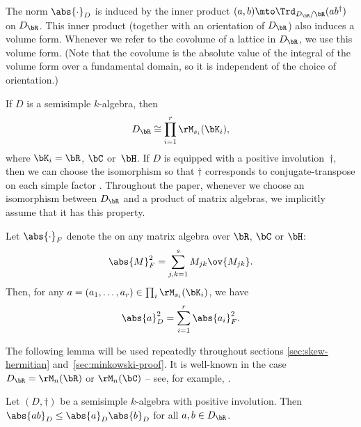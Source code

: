 The norm $\abs{\cdot}_D$ is induced by the inner product $(a,b) \mto \Trd_{D_\bR/\bR}(ab^\dag)$ on $D_\bR$.
This inner product (together with an orientation of $D_\bR$) also induces a volume form. Whenever we refer to the covolume of a lattice in $D_\bR$, we use this volume form.
(Note that the covolume is the absolute value of the integral of the volume form over a fundamental domain, so it is independent of the choice of orientation.)

If $D$ is a semisimple $k$-algebra, then
\[
D_\bR \cong \prod_{i=1}^r \rM_{s_i}(\bK_i),
\]
where $\bK_i = \bR$, $\bC$ or~$\bH$.
If $D$ is equipped with a positive involution~$\dag$, then we can choose the isomorphism so that $\dag$ corresponds to conjugate-transpose on each simple factor \cite[Prop.\,8.4.7]{Voi21}.
Throughout the paper, whenever we choose an isomorphism between $D_\bR$ and a product of matrix algebras, we implicitly assume that it has this property.

Let $\abs{\cdot}_F$ denote the  on any matrix algebra over $\bR$, $\bC$ or $\bH$:
\[
\abs{M}_F^2 = \sum_{j,k=1}^s M_{jk} \ov{M_{jk}}.
\]
Then, for any $a = (a_1, \dotsc, a_r) \in \prod_i \rM_{s_i}(\bK_i)$, we have
\[
\abs{a}_D^2 = \sum_{i=1}^r \abs{a_i}_F^2.
\]

The following lemma will be used repeatedly throughout sections \ref{sec:skew-hermitian} and~\ref{sec:minkowski-proof}. It is well-known in the case $D_\bR = \rM_n(\bR)$ or $\rM_n(\bC)$ -- see, for example, \cite[p.\,291]{HJ85}.

\begin{lemma} \label{length-submult}
Let $(D, \dag)$ be a semisimple $k$-algebra with positive involution.
Then $\abs{ab}_D \leq \abs{a}_D \abs{b}_D$ for all $a, b \in D_\bR$.
\end{lemma}

